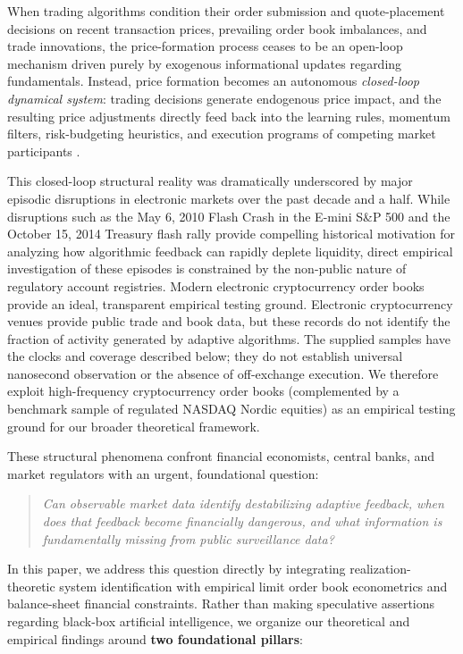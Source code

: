 \documentclass[12pt]{article}
\theoremstyle{definition}
\theoremstyle{remark}
\begin{document}
When trading algorithms condition their order submission and quote-placement decisions on recent transaction prices, prevailing order book imbalances, and trade innovations, the price-formation process ceases to be an open-loop mechanism driven purely by exogenous informational updates regarding fundamentals. Instead, price formation becomes an autonomous \emph{closed-loop dynamical system}: trading decisions generate endogenous price impact, and the resulting price adjustments directly feed back into the learning rules, momentum filters, risk-budgeting heuristics, and execution programs of competing market participants \citep{bouchaud2004fluctuations,cont2010stochastic,cont2014}. 

This closed-loop structural reality was dramatically underscored by major episodic disruptions in electronic markets over the past decade and a half. While disruptions such as the May 6, 2010 Flash Crash in the E-mini S\&P 500 and the October 15, 2014 Treasury flash rally provide compelling historical motivation for analyzing how algorithmic feedback can rapidly deplete liquidity, direct empirical investigation of these episodes is constrained by the non-public nature of regulatory account registries. Modern electronic cryptocurrency order books provide an ideal, transparent empirical testing ground. Electronic cryptocurrency venues provide public trade and book data, but these records do not identify the fraction of activity generated by adaptive algorithms. The supplied samples have the clocks and coverage described below; they do not establish universal nanosecond observation or the absence of off-exchange execution. We therefore exploit high-frequency cryptocurrency order books (complemented by a benchmark sample of regulated NASDAQ Nordic equities) as an empirical testing ground for our broader theoretical framework.

These structural phenomena confront financial economists, central banks, and market regulators with an urgent, foundational question:
\begin{quote}
\centering
\emph{Can observable market data identify destabilizing adaptive feedback, when does that feedback become financially dangerous, and what information is fundamentally missing from public surveillance data?}
\end{quote}

In this paper, we address this question directly by integrating realization-theoretic system identification with empirical limit order book econometrics and balance-sheet financial constraints. Rather than making speculative assertions regarding black-box artificial intelligence, we organize our theoretical and empirical findings around \textbf{two foundational pillars}:
\end{document}
